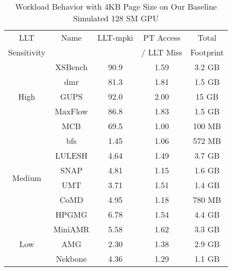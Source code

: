 \begin {table}[b]
\small
\begin{center} 
\vspace{-0.2 in}
\caption{Workload Behavior with 4KB Page Size on Our Baseline
  Simulated 128 SM GPU }
\vspace{-0.1 in}
\begin{tabular}{| c | c | c | c | c | }
\hline
  LLT                   & Name     &  LLT-mpki  & PT Access    &  Total  \\ 
  Sensitivity           &          &            & / LLT Miss   &  Footprint       \\ \hline
\multirow{5}{*}{High}   & XSBench  & 90.9       & 1.59         &  3.2 GB  \\
                        & dmr      & 81.3       & 1.81         &  1.5 GB  \\
                        & GUPS     & 92.0       & 2.00         &  15  GB  \\
                        & MaxFlow  & 86.8       & 1.83         &  1.5 GB  \\
                        & MCB      & 69.5       & 1.00         &  100 MB  \\ \hline
\multirow{6}{*}{Medium} & bfs      & 1.45       & 1.06         &  572 MB  \\
                        & LULESH   & 4.64       & 1.49         &  3.7  GB \\
                        & SNAP     & 4.81       & 1.15         &  1.6 GB  \\
                        & UMT      & 3.71       & 1.51         &  1.4 GB  \\
                        & CoMD     & 4.95       & 1.18         &  780 MB  \\
                        & HPGMG    & 6.78       & 1.54         &  4.4 GB  \\ \hline 
\multirow{3}{*}{Low}    & MiniAMR  & 5.58       & 1.62         &  3.3 GB  \\
                        & AMG      & 2.30       & 1.38         &  2.9 GB  \\ 
                        & Nekbone  & 4.36       & 1.29         &  1.1 GB  \\ \hline


\end{tabular}
\label{table:bench_char}
\vspace{-0.3in}
\end{center}
\normalsize
\end{table}
